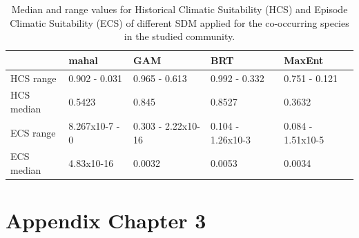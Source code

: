 \documentclass[11pt,twoside]{reedthesis}
\begin{document}
\setlength{\abovecaptionskip}{15pt}
\begin{table}[H]

\caption[Median and range values for Historical Climatic Suitability and Episode Climatic Suitability]{\label{tab:unnamed-chunk-12}Median and range values for Historical Climatic Suitability (HCS) and Episode Climatic Suitability (ECS) of different SDM applied for the co-occurring species in the studied community.}
\centering
\fontsize{8}{10}\selectfont
\begin{tabular}[t]{lllll}
\toprule
  & mahal & GAM & BRT & MaxEnt\\
\midrule
HCS range & 0.902 - 0.031 & 0.965 - 0.613 & 0.992 - 0.332 & 0.751 - 0.121\\
HCS median & 0.5423 & 0.845 & 0.8527 & 0.3632\\
ECS range & 8.267x10-7 - 0 & 0.303 - 2.22x10-16 & 0.104 - 1.26x10-3 & 0.084 - 1.51x10-5\\
ECS median & 4.83x10-16 & 0.0032 & 0.0053 & 0.0034\\
\bottomrule
\end{tabular}
\end{table}
\setlength{\abovecaptionskip}{0pt}

\chapter{Appendix Chapter 3}\label{appendix-chapter-3}

\newpage
\end{document}
